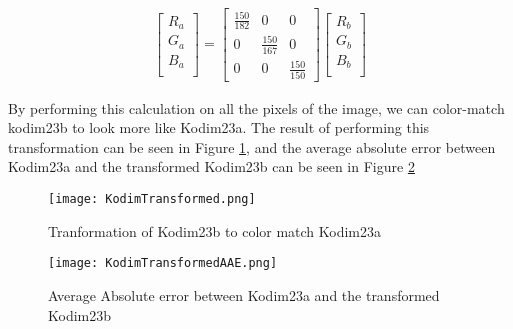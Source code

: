 \begin{gather}
    \begin{bmatrix}
        R_a \\
        G_a \\
        B_a \\       
    \end{bmatrix}
    =
    \begin{bmatrix}
        \frac{150}{182} & 0 & 0 \\
        0 & \frac{150}{167} & 0 \\
        0 & 0 & \frac{150}{150}
    \end{bmatrix}
    \begin{bmatrix}
        R_b \\
        G_b \\
        B_b \\
    \end{bmatrix}
\end{gather}

By performing this calculation on all the pixels of the image, we can color-match kodim23b to look more like Kodim23a. The result of performing this transformation can be seen in Figure \ref{fig:KodimTransform}, and the average absolute error between Kodim23a and the transformed Kodim23b can be seen in Figure \ref{fig:KodimAAE}

\begin{figure}[!h]
    \texttt{[image: KodimTransformed.png]}
    \centering
    \caption{Tranformation of Kodim23b to color match Kodim23a}
    \label{fig:KodimTransform}
\end{figure}

\begin{figure}[!h]
    \texttt{[image: KodimTransformedAAE.png]}
    \centering
    \caption{Average Absolute error between Kodim23a and the transformed Kodim23b}
    \label{fig:KodimAAE}
\end{figure}
